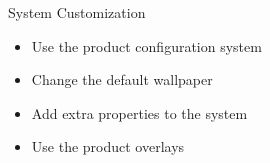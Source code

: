 \setuplabframe
{System Customization}
{
  \begin{itemize}
  \item Use the product configuration system
  \item Change the default wallpaper
  \item Add extra properties to the system
  \item Use the product overlays
  \end{itemize}
}